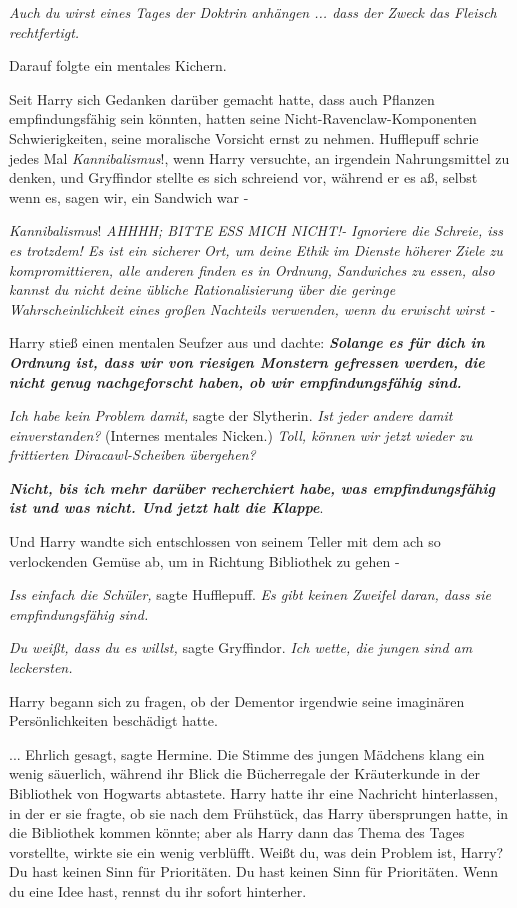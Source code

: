 \emph{Auch du wirst eines Tages der Doktrin anhängen ... dass der Zweck das
Fleisch rechtfertigt.}

Darauf folgte ein mentales Kichern.

Seit Harry sich Gedanken darüber gemacht hatte, dass auch Pflanzen
empfindungsfähig sein könnten, hatten seine Nicht-Ravenclaw-Komponenten
Schwierigkeiten, seine moralische Vorsicht ernst zu nehmen. Hufflepuff schrie
jedes Mal \glqq{}\emph{Kannibalismus}!\grqq{}, wenn Harry versuchte, an irgendein
Nahrungsmittel zu denken, und Gryffindor stellte es sich schreiend vor, während
er es aß, selbst wenn es, sagen wir, ein Sandwich war -

\emph{Kannibalismus}!
\emph{AHHHH; BITTE ESS MICH NICHT!-}
\emph{Ignoriere die Schreie, iss es trotzdem! Es ist ein sicherer Ort, um deine
Ethik im Dienste höherer Ziele zu kompromittieren, alle anderen finden es in
Ordnung, Sandwiches zu essen, also kannst du nicht deine übliche
Rationalisierung über die geringe Wahrscheinlichkeit eines großen Nachteils
verwenden, wenn du erwischt wirst -}

Harry stieß einen mentalen Seufzer aus und dachte: \textbf{\emph{Solange es für
dich in Ordnung ist, dass wir von riesigen Monstern gefressen werden, die nicht
genug nachgeforscht haben, ob wir empfindungsfähig sind.} }

\emph{Ich habe kein Problem damit,} sagte der Slytherin. \emph{Ist jeder andere
damit einverstanden?} (Internes mentales Nicken.) \emph{Toll, können wir jetzt
wieder zu frittierten Diracawl-Scheiben übergehen?}

\textbf{\emph{Nicht, bis ich mehr darüber recherchiert habe, was
empfindungsfähig ist und was nicht. Und jetzt halt die Klappe}}.

Und Harry wandte sich entschlossen von seinem Teller mit dem ach so verlockenden
Gemüse ab, um in Richtung Bibliothek zu gehen -

\emph{Iss einfach die Schüler,} sagte Hufflepuff.
\emph{Es gibt keinen Zweifel daran, dass sie empfindungsfähig sind.}

\emph{Du weißt, dass du es willst,} sagte Gryffindor.
\emph{Ich wette, die jungen sind am leckersten.}

Harry begann sich zu fragen, ob der Dementor irgendwie seine imaginären
Persönlichkeiten beschädigt hatte.

... \glqq{}Ehrlich gesagt\grqq{}, sagte Hermine. Die Stimme des jungen Mädchens
klang ein wenig säuerlich, während ihr Blick die Bücherregale der Kräuterkunde
in der Bibliothek von Hogwarts abtastete. Harry hatte ihr eine Nachricht
hinterlassen, in der er sie fragte, ob sie nach dem Frühstück, das Harry
übersprungen hatte, in die Bibliothek kommen könnte; aber als Harry dann das
Thema des Tages vorstellte, wirkte sie ein wenig verblüfft. \glqq{}Weißt du, was
dein Problem ist, Harry? Du hast keinen Sinn für Prioritäten. Du hast keinen
Sinn für Prioritäten. Wenn du eine Idee hast, rennst du ihr sofort hinterher.\grqq{}

